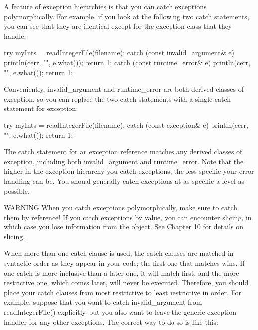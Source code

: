 
A feature of exception hierarchies is that you can catch exceptions polymorphically. For example, if you look at the following two catch statements, you can see that they are identical except for the exception class that they handle:

\begin{cpp}
try {
    myInts = readIntegerFile(filename);
} catch (const invalid_argument& e) {
    println(cerr, "{}", e.what());
    return 1;
} catch (const runtime_error& e) {
    println(cerr, "{}", e.what());
    return 1;
}
\end{cpp}

Conveniently, invalid\_argument and runtime\_error are both derived classes of exception, so you can replace the two catch statements with a single catch statement for exception:

\begin{cpp}
try {
    myInts = readIntegerFile(filename);
} catch (const exception& e) {
    println(cerr, "{}", e.what());
    return 1;
}
\end{cpp}

The catch statement for an exception reference matches any derived classes of exception, including both invalid\_argument and runtime\_error. Note that the higher in the exception hierarchy you catch exceptions, the less specific your error handling can be. You should generally catch exceptions at as specific a level as possible.

\begin{myWarning}{WARNING}
When you catch exceptions polymorphically, make sure to catch them by reference! If you catch exceptions by value, you can encounter slicing, in which case you lose information from the object. See Chapter 10 for details on slicing.
\end{myWarning}

When more than one catch clause is used, the catch clauses are matched in syntactic order as they appear in your code; the first one that matches wins. If one catch is more inclusive than a later one, it will match first, and the more restrictive one, which comes later, will never be executed. Therefore, you should place your catch clauses from most restrictive to least restrictive in order. For example, suppose that you want to catch invalid\_argument from readIntegerFile() explicitly, but you also want to leave the generic exception handler for any other exceptions. The correct way to do so is like this:


